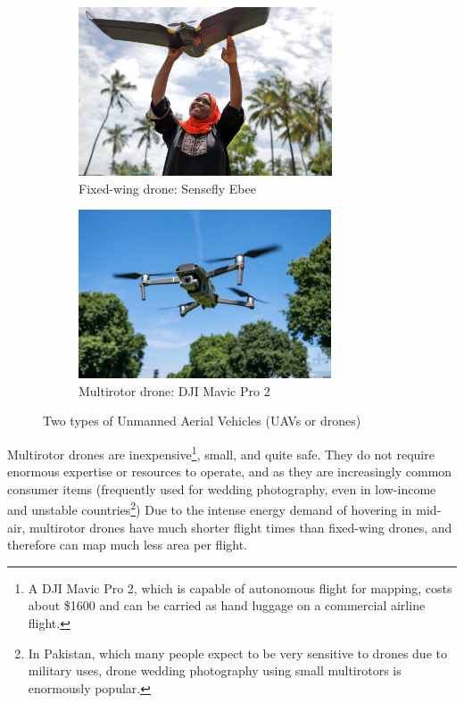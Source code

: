 \documentclass[a4paper,12pt,twoside]{article}
\begin{document}
\begin{figure}[H]
\begin{subfigure}{0.5\textwidth}
\includegraphics[width=0.9\linewidth, height=5cm]{images/Zanzibar_ebee.jpg} 
\caption{Fixed-wing drone: Sensefly Ebee}
\label{fig:subim1}
\end{subfigure}
\begin{subfigure}{0.5\textwidth}
\includegraphics[width=0.9\linewidth, height=5cm]{images/dji-mavic-2-pro.jpg}
\caption{Multirotor drone: DJI Mavic Pro 2}
\label{fig:subim2}
\end{subfigure}
\caption{Two types of Unmanned Aerial Vehicles (UAVs or drones)}
\label{fig:image2}
\end{figure}


Multirotor drones are inexpensive\footnote{A DJI Mavic Pro 2, which is capable of autonomous flight for mapping, costs about \$1600 and can be carried as hand luggage on a commercial airline flight.}, small, and quite safe. They do not require enormous expertise or resources to operate, and as they are increasingly common consumer items (frequently used for wedding photography, even in low-income and unstable countries\footnote{In Pakistan, which many people expect to be very sensitive to drones due to military uses, drone wedding photography using small multirotors is enormously popular.}) Due to the intense energy demand of hovering in mid-air, multirotor drones have much shorter flight times than fixed-wing drones, and therefore can map much less area per flight.
\end{document}
